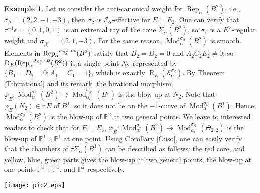 \documentclass{amsart}
\theoremstyle{definition}
\newtheorem{example}[theorem]{Example}
\theoremstyle{remark}
\numberwithin{equation}{section}
\begin{document}
\begin{example}
Let us consider the anti-canonical weight for ${\operatorname{Rep}}_\alpha(B^2)$, i.e., $\sigma_\beta=(2,2,-1,-3)$, then $\sigma_\beta$ is ${\mathcal{{E}}}_\alpha$-effective for $E=E_2$. One can verify that $\tau^{-1}\epsilon=(0,1,0,1)$ is an extremal ray of the cone $\Sigma_\alpha(B^2)$, so $\sigma_\beta$ is a $E^\vee$-regular weight and $\sigma_{\beta_\epsilon^\vee}=(2,1,-3)$. For the same reason, ${\operatorname{Mod}}_\alpha^{\sigma_\beta}(B^2)$ is smooth. Elements in ${\operatorname{Rep}}_\alpha{^{\sigma_{{\beta_\epsilon^\vee}}\cdot{\rm {us}}}}(B^2)$ satisfy that $B_2=D_2=0$ and $A_2C_2E_2\neq 0$, so ${\operatorname{R}}_E({\operatorname{Rep}}_\alpha{^{\sigma_{{\beta_\epsilon^\vee}}\cdot{\rm {us}}}}(B^2))$ is a single point $N_2$ represented by $\{B_1=D_1=0; A_1=C_1=1\}$, which is exactly ${\operatorname{R}}_E({\mathcal{{E}}}_\alpha^{\sigma_\beta})$. By Theorem \ref{T:birational} and its remark, the birational morphism $\varphi_E: {\operatorname{Mod}}_\alpha^{\sigma_\beta}(B^2)\to {\operatorname{Mod}}_{\alpha_\epsilon}^{\sigma_{\beta_\epsilon^\vee}}(B^1)$ is the blow-up at $N_2$.  Note that $\varphi_E(N_2)\in {{^\perp}\!} E$ of $B^1$, so it does not lie on the $-1$-curve of ${\operatorname{Mod}}_\alpha^{\sigma_\beta}(B^1)$. Hence ${\operatorname{Mod}}_\alpha^{\sigma_\beta}(B^2)$ is the blow-up of ${\mathbb{{P}}}^2$ at two general points. We leave to interested readers to check that for $E=E_3$, $\varphi_E: {\operatorname{Mod}}_\alpha^{\sigma_\beta}(B^2)\to {\operatorname{Mod}}_{\alpha_\epsilon}^{\sigma_{\beta_\epsilon}}(\Theta_{2,2})$ is the blow-up of ${\mathbb{{P}}}^1\times{\mathbb{{P}}}^1$ at one point. Using Corollary \ref{C:iso}, one can easily verify that the chambers of $\tau\Sigma_\alpha(B^3)$ can be described as follows: the red core, and yellow, blue, green parts gives the blow-up at two general points, the blow-up at one point, ${\mathbb{{P}}}^1\times{\mathbb{{P}}}^1$, and ${\mathbb{{P}}}^2$ respectively.

\begin{center}
\texttt{[image: pic2.eps]}
\end{center}


\end{example}
\end{document}
